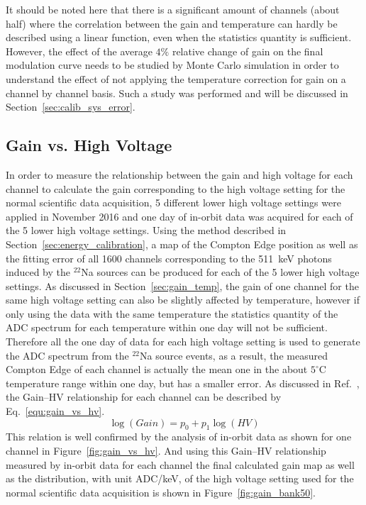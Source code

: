 \documentclass[preprint,sort&compress,12pt]{elsarticle}
\begin{document}
It should be noted here that there is a significant amount of channels (about half) where the correlation between the gain and temperature can hardly be described using a linear function, even when the statistics quantity is sufficient. However, the effect of the average $4\% $ relative change of gain on the final modulation curve needs to be studied by Monte Carlo simulation in order to understand the effect of not applying the temperature correction for gain on a channel by channel basis. Such a study was performed and will be discussed in Section~\ref{sec:calib_sys_error}.

\subsection{Gain vs. High Voltage}\label{sec:gain_hv}

In order to measure the relationship between the gain and high voltage for each channel to calculate the gain corresponding to the high voltage setting for the normal scientific data acquisition, 5 different lower high voltage settings were applied in November 2016 and one day of in-orbit data was acquired for each of the 5 lower high voltage settings. Using the method described in Section~\ref{sec:energy_calibration}, a map of the Compton Edge position as well as the fitting error of all 1600 channels corresponding to the 511~keV photons induced by the $^{22}$Na sources can be produced for each of the 5 lower high voltage settings. 
As discussed in Section~\ref{sec:gain_temp}, the gain of one channel for the same high voltage setting can also be slightly affected by temperature, however if only using the data with the same temperature the statistics quantity of the ADC spectrum for each temperature within one day will not be sufficient. Therefore all the one day of data for each high voltage setting is used to generate the ADC spectrum from the $^{22}$Na source events, as a result, the measured Compton Edge of each channel is actually the mean one in the about $5^\circ\mathrm{C}$ temperature range within one day, but has a smaller error. As discussed in Ref.~\cite{Zhang2018}, the Gain--HV relationship for each channel can be described by Eq.~\eqref{equ:gain_vs_hv}.
\begin{equation}\label{equ:gain_vs_hv}
\log(Gain) = p_0 + p_1 \log(HV)
\end{equation}
This relation is well confirmed by the analysis of in-orbit data as shown for one channel in Figure~\ref{fig:gain_vs_hv}. And using this Gain--HV relationship measured by in-orbit data for each channel the final calculated gain map as well as the distribution, with unit ADC/keV, of the high voltage setting used for the normal scientific data acquisition is shown in Figure~\ref{fig:gain_bank50}.
\end{document}
